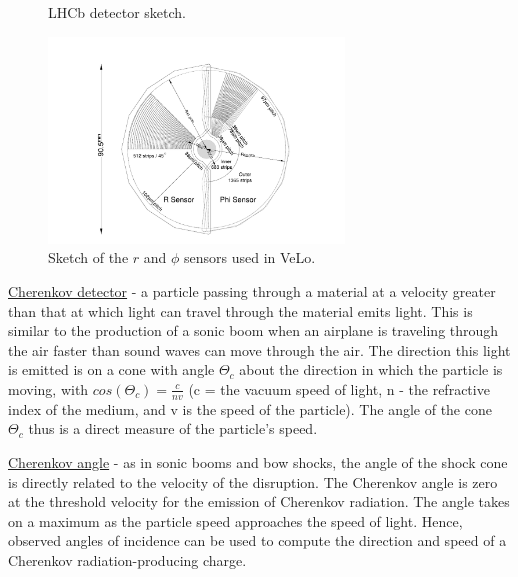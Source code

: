 \documentclass[11pt,a4paper,twoside]{article}
\begin{document}
\begin{enumerate}
\begin{figure}[H]
            \caption{LHCb detector sketch.}
            \label{fig:001-LHCb_detector}
        \end{figure}

        \begin{figure}[H]
            \centering

            \includegraphics[width=0.7\textwidth]{visuals/006-sensors-in-VeLo.png}
            
            \caption{Sketch of the $r$ and $\phi$ sensors used in VeLo.}
            \label{fig:001-LHCb_detector}
        \end{figure}

        \underline{Cherenkov detector} - a particle passing through a material at a velocity greater than that at which light can travel through the material emits light. This is similar to the production of a sonic boom when an airplane is traveling through the air faster than sound waves can move through the air. The direction this light is emitted is on a cone with angle $\Theta_c$ about the direction in which the particle is moving, with $cos(\Theta_c) = \frac{c}{nv}$ (c = the vacuum speed of light, n - the refractive index of the medium, and v is the speed of the particle). The angle of the cone $\Theta_c$ thus is a direct measure of the particle's speed. 

        \underline{Cherenkov angle} - as in sonic booms and bow shocks, the angle of the shock cone is directly related to the velocity of the disruption. The Cherenkov angle is zero at the threshold velocity for the emission of Cherenkov radiation. The angle takes on a maximum as the particle speed approaches the speed of light. Hence, observed angles of incidence can be used to compute the direction and speed of a Cherenkov radiation-producing charge.

        \begin{figure}[H]
            \centering


\end{figure}
\end{enumerate}
\end{document}
